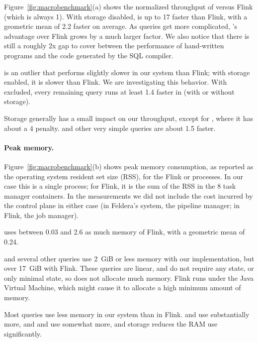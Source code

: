 Figure~\ref{fig:macrobenchmark}(a) shows the normalized throughput of
\dbsp versus Flink (which is always 1).  With storage disabled, \dbsp
is up to 17\x{} faster than Flink, with a geometric mean of 2.2\x{}
faster on average.  As queries get more complicated, \dbsp's advantage
over Flink grows by a much larger factor.  We also notice that there
is still a roughly 2x gap to cover between the performance of
hand-written \dbsp programs and the code generated by the SQL
compiler.

 is an outlier that performs slightly slower in our system
than Flink; with storage enabled, it is slower than Flink.  We are
investigating this behavior.  With  excluded, every
remaining query runs at least 1.4\x{} faster in \dbsp (with or without
storage).

Storage generally has a small impact on our throughput, except for
, where it has about a 4\x{} penalty.   and other
very simple queries are about 1.5\x{} faster.

\paragraph{Peak memory.}

Figure~\ref{fig:macrobenchmark}(b) shows peak memory consumption, as
reported as the operating system resident set size (RSS), for the
Flink or \dbsp processes.  In our case this is a single process; for
Flink, it is the sum of the RSS in the 8 task manager containers.  In
the measurements we did not include the cost incurred by the control
plane in either case (in Feldera's system, the pipeline manager; in
Flink, the job manager).

\dbsp uses between 0.03\x{} and 2.6\x{} as much memory of Flink, with a
geometric mean of 0.24\x{}.

 and several other queries use 2~GiB or less memory with our
implementation, but over 17~GiB with Flink.  These queries are linear,
and do not require any state, or only minimal state, so \dbsp does not
allocate much memory.  Flink runs under the Java Virtual Machine,
which might cause it to allocate a high minimum amount of memory.

Most queries use less memory in our system than in Flink.  
and  use substantially more, and  and
 use somewhat more, and storage reduces the RAM use
significantly.
